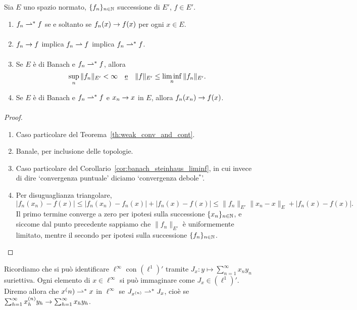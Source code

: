 \begin{lemma}
	Sia $E$ uno spazio normato, $\{f_n\}_{n \in \mathbb{N}}$ successione di $E'$, $f \in E'$.
	\begin{enumerate}
		\item $f_n \rightharpoonup^* f$ se e soltanto se $f_n(x) \underset{{}}{\rightarrow} f(x)$ per ogni $x \in E$.
		\item $f_n \underset{{}}{\rightarrow} f$ implica $f_n \rightharpoonup f$ implica $f_n \rightharpoonup^* f$.
		\item Se $E$ è di Banach e $f_n \rightharpoonup^* f$, allora
		\begin{equation*}
			\sup_n \|f_n\|_{E'} < \infty \quad\text{\underline{e}}\quad \|f\|_{E'} \leq \liminf_n \|f_n\|_{E'}.
		\end{equation*}
		\item Se $E$ è di Banach e $f_n \rightharpoonup^* f$ e $x_n \underset{{}}{\rightarrow} x$ in $E$, allora $f_n(x_n) \underset{{}}{\rightarrow} f(x)$.
	\end{enumerate}
\end{lemma}
\begin{proof}
	\leavevmode
	\begin{enumerate}
		\item Caso particolare del Teorema~\ref{th:weak_conv_and_cont}.
		\item Banale, per inclusione delle topologie.
		\item Caso particolare del Corollario~\ref{cor:banach_steinhaus_liminf}, in cui invece di dire `convergenza puntuale' diciamo `convergenza debole$^*$'.
		\item Per disuguaglianza triangolare,
		\begin{equation*}
			|f_n(x_n) - f(x)| \leq |f_n(x_n) - f_n(x)| + |f_n(x) - f(x)| \leq \|f_n\|_{E'}\|x_n - x\|_E + |f_n(x) - f(x)|.
		\end{equation*}
		Il primo termine converge a zero per ipotesi sulla successione $\{x_n\}_{n \in \mathbb{N}}$, e siccome dal punto precedente sappiamo che $\|f_n\|_{E'}$ è uniformemente limitato, mentre il secondo per ipotesi sulla successione $\{f_n\}_{n \in \mathbb{N}}$.
	\end{enumerate}
\end{proof}

\begin{example}
	Ricordiamo che si può identificare $\ell^\infty$ con $(\ell^1)'$ tramite $J_x : y \mapsto \sum_{n=1}^\infty x_n y_n$ suriettiva. Ogni elemento di $x \in \ell^\infty$ si può immaginare come $J_x \in (\ell^1)'$. Diremo allora che $x^(n) \rightharpoonup^* x$ in $\ell^\infty$ se $J_{x^{(n)}} \rightharpoonup^* J_x$, cioè se $\sum_{h=1}^\infty x^{(n)}_h y_h \underset{{}}{\rightarrow} \sum_{h=1}^\infty x_hy_h$.
\end{example}

